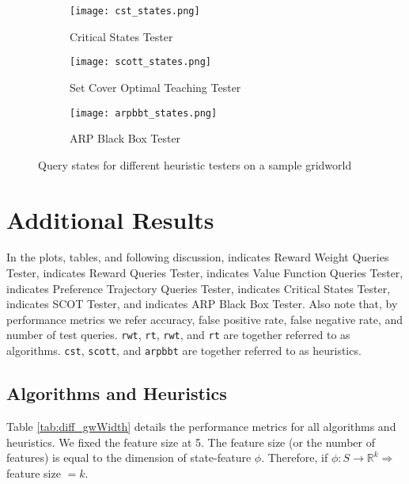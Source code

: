 \begin{figure}[hbtp]
     \centering
     \begin{subfigure}[hbtp]{0.3\textwidth}
         \centering
         \texttt{[image: cst\_states.png]}
         \caption{Critical States Tester}
         \label{fig:cst}
     \end{subfigure}
    \hspace{5mm}
     \begin{subfigure}[hbtp]{0.3\textwidth}
         \centering
         \texttt{[image: scott\_states.png]}
         \caption{Set Cover Optimal Teaching Tester}
         \label{fig:scot}
     \end{subfigure}
     \hspace{5mm}
     \begin{subfigure}[hbtp]{0.3\textwidth}
         \centering
         \texttt{[image: arpbbt\_states.png]}
         \caption{ARP Black Box Tester}
         \label{fig:arpbb}
     \end{subfigure}
        \caption{Query states for different heuristic testers on a sample gridworld}
        \label{fig:heuristics_states}
\end{figure}

\section{Additional Results}
In the plots, tables, and following discussion, {} indicates Reward Weight Queries Tester, {} indicates Reward Queries Tester, {} indicates Value Function Queries Tester, {} indicates Preference Trajectory Queries Tester, {} indicates Critical States Tester, {} indicates SCOT Tester, and {} indicates ARP Black Box Tester. Also note that, by performance metrics we refer accuracy, false positive rate, false negative rate, and number of test queries. \texttt{rwt}, \texttt{rt}, \texttt{rwt}, and \texttt{rt} are together referred to as algorithms. \texttt{cst}, \texttt{scott}, and \texttt{arpbbt} are together referred to as heuristics.

\subsection{Algorithms and Heuristics}
Table \ref{tab:diff_gwWidth} details the performance metrics for all algorithms and heuristics. We fixed the feature size at 5. The feature size (or the number of features) is equal to the dimension of state-feature $\phi$. Therefore, if $\phi: S \rightarrow \mathbb{R}^k \Rightarrow$ feature size $ = k$. 

